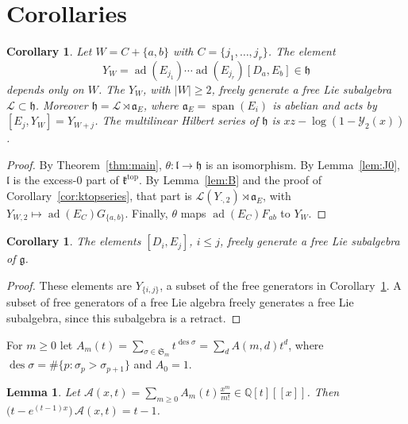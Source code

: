 \documentclass[11pt]{amsart}
\newtheorem{lemma}[theorem]{Lemma}
\newtheorem{corollary}[theorem]{Corollary}
\theoremstyle{definition}
\theoremstyle{remark}
\newcommand{\Q}{\mathbb{Q}}
\newcommand{\g}{\mathfrak{g}}
\newcommand{\h}{\mathfrak{h}}
\newcommand{\lie}{\mathfrak{l}}
\newcommand{\ktop}{\mathfrak{k}^{\mathrm{top}}}
\newcommand{\af}{\mathfrak{a}}
\newcommand{\Lf}{\mathcal{L}}
\newcommand{\ad}{\operatorname{ad}}
\begin{document}
\section{Corollaries}\label{sec:cor}

\begin{corollary}\label{cor:structure}
Let $W=C+\{a,b\}$ with $C=\{j_1,\dots,j_r\}$. The element
\[
Y_W=\ad(E_{j_1})\cdots\ad(E_{j_r})[D_a,E_b]\in\h
\]
depends only on $W$. The $Y_W$, with $|W|\ge2$, freely generate a free Lie subalgebra $\Lf\subset\h$. Moreover $\h=\Lf\rtimes\af_E$, where $\af_E=\operatorname{span}(E_i)$ is abelian and acts by $[E_j,Y_W]=Y_{W+j}$. The multilinear Hilbert series of $\h$ is $xz-\log(1-\mathcal Y_2(x))$.
\end{corollary}

\begin{proof}
By Theorem~\ref{thm:main}, $\theta\colon\lie\to\h$ is an isomorphism. By Lemma~\ref{lem:J0}, $\lie$ is the excess-$0$ part of $\ktop$. By Lemma~\ref{lem:B} and the proof of Corollary~\ref{cor:ktopseries}, that part is $\Lf(Y_{\cdot,2})\rtimes\af_E$, with $Y_{W,2}\mapsto\ad(E_{C})G_{\{a,b\}}$. Finally, $\theta$ maps $\ad(E_{C})F_{ab}$ to $Y_W$.
\end{proof}

\begin{corollary}\label{cor:free}
The elements $[D_i,E_j]$, $i\le j$, freely generate a free Lie subalgebra of $\g$.
\end{corollary}

\begin{proof}
These elements are $Y_{\{i,j\}}$, a subset of the free generators in Corollary~\ref{cor:structure}. A subset of free generators of a free Lie algebra freely generates a free Lie subalgebra, since this subalgebra is a retract.
\end{proof}

For $m\ge0$ let $A_m(t)=\sum_{\sigma\in\mathfrak S_m}t^{\operatorname{des}\sigma}=\sum_dA(m,d)t^d$, where $\operatorname{des}\sigma=\#\{p:\sigma_p>\sigma_{p+1}\}$ and $A_0=1$.

\begin{lemma}\label{lem:euler}
Let $\mathcal A(x,t)=\sum_{m\ge0}A_m(t)\frac{x^m}{m!}\in\Q[t][[x]]$. Then $\big(t-e^{(t-1)x}\big)\,\mathcal A(x,t)=t-1$.
\end{lemma}
\end{document}
